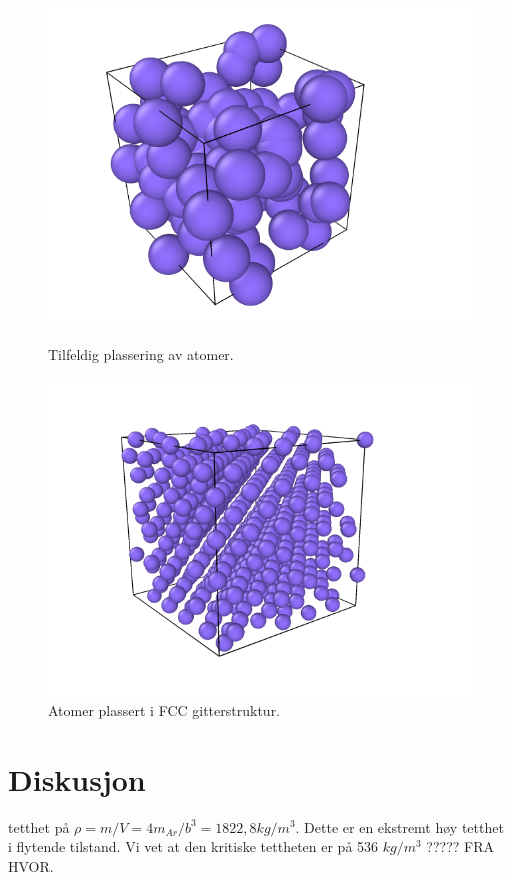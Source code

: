 \documentclass[paper=a4, fontsize=11pt]{scrartcl} %
\numberwithin{equation}{section} %
\numberwithin{figure}{section} %
\numberwithin{table}{section} %
\begin{document}
 \FloatBarrier
\begin{figure}[!htb]
  \includegraphics[width=\linewidth]{5cnoFCC.png}
  \caption{Tilfeldig plassering av atomer.}\label{fcuk}
\endminipage\hfill
{}
  \includegraphics[width=\linewidth]{5cFCC.png}
  \caption{Atomer plassert i FCC gitterstruktur.}\label{fcuk2}
\endminipage\hfill
\end{figure}
 \FloatBarrier


\section{Diskusjon}
tetthet på $\rho = m/V = 4m_{Ar}/b^3 = 1822,8 kg/m^3$. Dette er en ekstremt høy tetthet i flytende tilstand. Vi vet at den kritiske tettheten er på 536 $kg/m^3$ ????? FRA HVOR.
\end{document}
